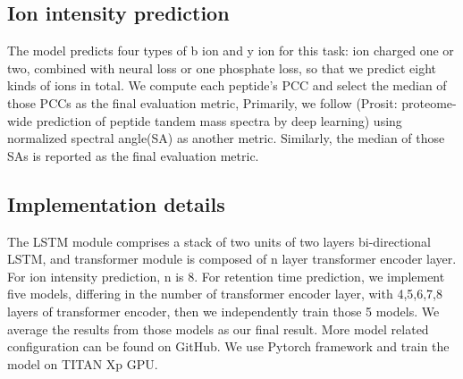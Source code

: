 \documentclass[final]{cvpr}
\begin{document}
\subsection*{Ion intensity prediction}

The model predicts four types of b ion and y ion for this task: ion charged one or two, combined with neural loss or one phosphate loss,
so that we predict eight kinds of ions in total.
We compute each peptide's PCC and select the median of those PCCs as the final evaluation metric, 
Primarily, we follow (Prosit: proteome-wide prediction of peptide tandem mass spectra by deep learning) using normalized 
spectral angle(SA) as another metric. Similarly, the median of those SAs is reported as the final evaluation metric.

\subsection*{Implementation details}
The LSTM module comprises a stack of two units of two layers bi-directional LSTM, and transformer module is composed of 
n layer transformer encoder layer. For ion intensity prediction, n is 8. For retention time prediction, we implement 
five models, differing in the number of transformer encoder layer, with 4,5,6,7,8 layers of transformer encoder, then we 
independently train those 5 models. We average the results from those models as our final result. More model 
related configuration can be found on GitHub. We use Pytorch framework and train the model on TITAN Xp GPU.
\end{document}

